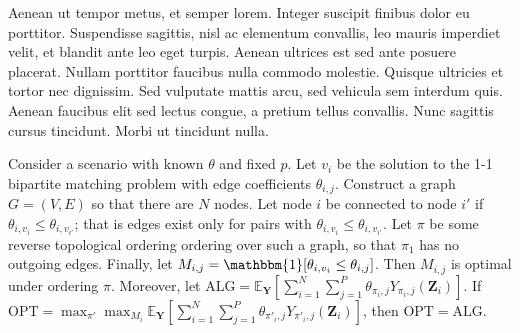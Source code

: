  Aenean ut tempor metus, et semper lorem. Integer suscipit finibus dolor eu porttitor. Suspendisse sagittis, nisl ac elementum convallis, leo mauris imperdiet velit, et blandit ante leo eget turpis. Aenean ultrices est sed ante posuere placerat. Nullam porttitor faucibus nulla commodo molestie. Quisque ultricies et tortor nec dignissim. Sed vulputate mattis arcu, sed vehicula sem interdum quis. Aenean faucibus elit sed lectus congue, a pretium tellus convallis. Nunc sagittis cursus tincidunt. Morbi ut tincidunt nulla.

\begin{lemma}
    Consider a scenario with known $\theta$ and fixed $p$. 
    Let $v_{i}$ be the solution to the 1-1 bipartite matching problem with edge coefficients $\theta_{i,j}$. 
    Construct a graph $G=(V,E)$ so that there are $N$ nodes. 
    Let node $i$ be connected to node $i'$ if $\theta_{i,v_{i}} \leq \theta_{i,v_{i'}}$; that is edges exist only for pairs with $\theta_{i,v_{i}} \leq \theta_{i,v_{i'}}$. 
    Let $\pi$ be some reverse topological ordering ordering over such a graph, so that $\pi_{1}$ has no outgoing edges. 
    Finally, let $M_{i,j} = \mathbbm{1}[\theta_{i,v_{i}} \leq \theta_{i,j}]$. 
    Then $M_{i,j}$ is optimal under ordering $\pi$. Moreover, let $\mathrm{ALG} = \mathbb{E}_{\mathbf{Y}}[\sum_{i=1}^{N} \sum_{j=1}^{P} \theta_{\pi_{i},j} Y_{\pi_{i},j}(\mathbf{Z}_{i})]$. 
    If $\mathrm{OPT} = \max_{\pi'} \max_{M_{i}} \mathbb{E}_{\mathbf{Y}}[\sum_{i=1}^{N} \sum_{j=1}^{P} \theta_{\pi'_{i},j} Y_{\pi'_{i},j}(\mathbf{Z}_{i})]$, then $\mathrm{OPT} = \mathrm{ALG}$.  
\end{lemma}
